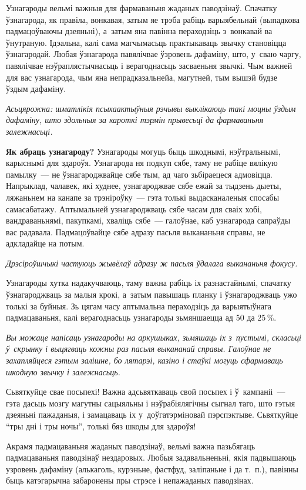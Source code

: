 Узнагароды вельмі важныя для фармаваньня жаданых паводзінаў. Спачатку ўзнагарода, як правіла, вонкавая, затым яе трэба рабіць варыябельнай (выпадкова падмацоўваючы дзеяньні), а~затым яна павінна пераходзіць з~вонкавай ва ўнутраную. Ідэальна, калі сама магчымасьць практыкаваць звычку становіцца ўзнагародай. Любая ўзнагарода павялічвае ўзровень дафаміну, што, у~сваю чаргу, павялічвае нэўраплястычнасьць і верагоднасьць засваеньня звычкі. Чым важней для вас узнагарода, чым яна непрадказальнейа, магутней, тым вышэй будзе ўздым дафаміну.

\emph{Асьцярожна: шматлікія псыхаактыўныя рэчывы выклікаюць такі моцны ўздым дафаміну, што здольныя за кароткі тэрмін прывесьці да фармаваньня залежнасьці.}

\textbf{Як абраць узнагароду?} Узнагароды могуць быць шкоднымі, нэўтральнымі, карыснымі для здароўя. Узнагарода ня подкуп сябе, таму не рабіце вялікую памылку~--- не ўзнагароджвайце сябе тым, ад чаго зьбіраецеся адмовіцца. Напрыклад, чалавек, які худнее, узнагароджвае сябе ежай за тыдзень дыеты, ляжаньнем на канапе за трэніроўку~--- гэта толькі выдасканаленыя спосабы самасабатажу. Аптымальней узнагароджваць сябе часам для сваіх хобі, вандраваньнямі, пакупкамі, хваліць сябе~--- галоўнае, каб узнагарода сапраўды вас радавала. Падмацоўвайце сябе адразу пасьля выкананьня справы, не адкладайце на потым.

\emph{Дрэсіроўшчыкі частуюць жывёлаў адразу ж пасьля ўдалага выкананьня фокусу.}

Узнагароды хутка надакучваюць, таму важна рабіць іх разнастайнымі, спачатку ўзнагароджваць за малыя крокі, а~затым павышаць планку і ўзнагароджваць ужо толькі за буйныя. Зь цягам часу аптымальна пераходзіць да варыятыўнага падмацаваньня, калі верагоднасьць узнагароды зьмяншаецца ад 50 да 25\,\%.

\emph{Вы можаце напісаць узнагароды на аркушыках, зьмяшаць іх з~пустымі, скласьці ў~скрынку і выцягваць кожны раз пасьля выкананай справы. Галоўнае не захапляйцеся гэтым залішне, бо лятарэі, казіно і стаўкі могуць сфармаваць шкодную звычку і залежнасьць.}

Сьвяткуйце свае посьпехі! Важна адсьвяткаваць свой посьпех і ў~кампаніі~--- гэта дасьць мозгу магутны сацыяльны і нэўрабіялягічны сыгнал таго, што гэтыя дзеяньні пажаданыя, і замацаваць іх у~доўгатэрміновай пэрспэктыве. Сьвяткуйце ``тры дні і тры ночы'', толькі бяз шкоды для здароўя!

Акрамя падмацаваньня жаданых паводзінаў, вельмі важна пазьбягаць падмацаваньня паводзінаў нездаровых. Любыя задавальненьні, якія падвышаюць узровень дафаміну (алькаголь, курэньне, фастфуд, заліпаньне і да т.~п.), павінны быць катэгарычна забаронены пры стрэсе і непажаданых паводзінах.

